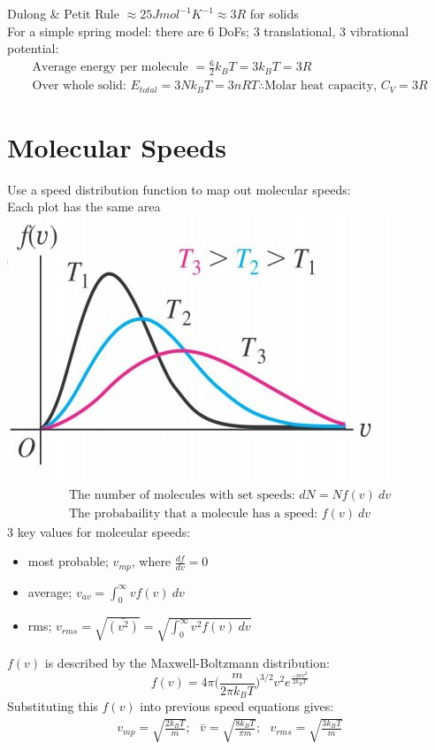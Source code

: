 \documentclass[a4paper, 11pt, fleqn, normalem]{report}
\begin{document}
Dulong \& Petit Rule $\approx 25 J mol^{-1} K^{-1} \approx 3R$ for solids \\
For a simple spring model: there are 6 DoFs; 3 translational, 3 vibrational potential:
\begin{gather*}
	\text{Average energy per molecule } = \frac{6}{2}k_{B}T = 3k_{B}T = 3R \\
	\text{Over whole solid: } E_{total} = 3Nk_{B}T = 3nRT
	\therefore \text{Molar heat capacity, } C_{V} = 3R
\end{gather*}

\section{Molecular Speeds}
Use a speed distribution function to map out molecular speeds:\\
Each plot has the same area \\
\includegraphics[scale=0.85]{Distribution.jpg}
\begin{gather*}
	\text{The number of molecules with set speeds: } dN = Nf(v)~dv \\
	\text{The probabaility that a molecule has a speed: } f(v)~dv
\end{gather*}
3 key values for molceular speeds:
\begin{itemize}
	\item most probable; $v_{mp}$, where $\frac{df}{dv} = 0$
	\item average; $v_{av} = \int_{0}^{\infty} vf(v)~dv$
	\item rms; $v_{rms} = \sqrt{\bar{(v^{2})}} = \sqrt{\int_{0}^{\infty} v^{2}f(v)~dv}$
\end{itemize}
$f(v)$ is described by the Maxwell-Boltzmann distribution:
\begin{equation*}
	f(v) = 4{\pi}\bigg(\frac{m}{2{\pi}k_{B}T}\bigg)^{3/2}v^{2}e^{\frac{-mv^{2}}{2k_{B}T}}
\end{equation*}
Substituting this $f(v)$ into previous speed equations gives:
\begin{gather*}
	v_{mp} = \sqrt{\frac{2k_{B}T}{m}};~~~\bar{v} = \sqrt{\frac{8k_{B}T}{{\pi}m}};~~~v_{rms} = \sqrt{\frac{3k_{B}T}{m}}
\end{gather*}
\end{document}
